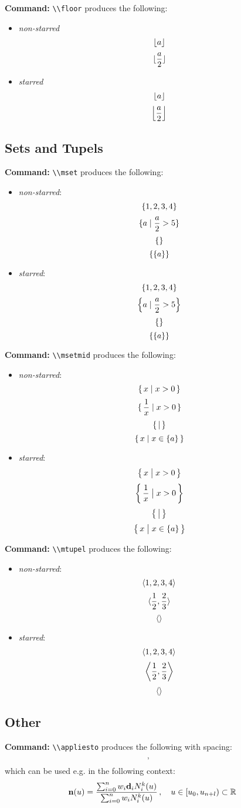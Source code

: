 \documentclass[10pt]{article}
\newcommand{\commandcmd}[1]{\par\noindent\textbf{Command:} \lstinline^\\#1^}
\begin{document}
\commandcmd{floor} produces the following:
\begin{itemize}
  \item \emph{non-starred}
        \[\floor{a}\]
        \[\floor{\frac{a}{2}}\]
  \item \emph{starred}
        \[\floor*{a}\]
        \[\floor*{\frac{a}{2}}\]
\end{itemize}

\subsection{Sets and Tupels}
\commandcmd{mset} produces the following:
\begin{itemize}
  \item \emph{non-starred}:
        \[\mset{1, 2, 3, 4}\]
        \[\mset{a \mid \frac{a}{2} > 5}\]
        \[\mset{}\]
        \[\mset{\mset{a}}\]
  \item \emph{starred}:
        \[\mset*{1, 2, 3, 4}\]
        \[\mset*{a \mid \frac{a}{2} > 5}\]
        \[\mset*{}\]
        \[\mset*{\mset*{a}}\]
\end{itemize}

\commandcmd{msetmid} produces the following:
\begin{itemize}
  \item \emph{non-starred}:
        \[\msetmid{x}{x > 0}\]
        \[\msetmid{\frac{1}{x}}{x > 0}\]
        \[\msetmid{}{}\]
        \[\msetmid{x}{x \in \mset{a}}\]
  \item \emph{starred}:
        \[\msetmid*{x}{x > 0}\]
        \[\msetmid*{\frac{1}{x}}{x > 0}\]
        \[\msetmid*{}{}\]
        \[\msetmid*{x}{x \in \mset{a}}\]
\end{itemize}

\commandcmd{mtupel} produces the following:
\begin{itemize}
  \item \emph{non-starred}:
        \[\mtupel{1, 2, 3, 4}\]
        \[\mtupel{\frac{1}{2}, \frac{2}{3}}\]
        \[\mtupel{}\]
  \item \emph{starred}:
        \[\mtupel*{1, 2, 3, 4}\]
        \[\mtupel*{\frac{1}{2}, \frac{2}{3}}\]
        \[\mtupel*{}\]
\end{itemize}

\subsection{Other}

\commandcmd{appliesto} produces the following with spacing:
\[\appliesto\]
which can be used e.g. in the following context:
\[\mathbf{n}(u) = \frac{\sum_{i = 0}^n w_i \mathbf{d}_i N_i^k(u)}{\sum_{i = 0}^n w_i N_i^k(u)} \appliesto u \in \left[u_0, u_{n + l}\right) \subset \mathbb{R}\]
\end{document}

